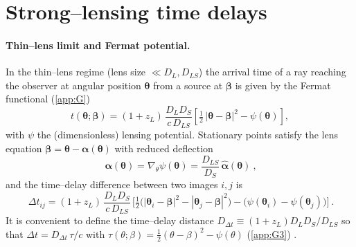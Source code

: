 \documentclass{iopjournal}
\begin{document}
\section{Strong–lensing time delays}\label{sec:delays}
\paragraph{Thin–lens limit and Fermat potential.}
In the thin–lens regime (lens size $\ll D_L,D_{LS}$) the arrival time of a ray reaching the observer at angular position $\boldsymbol\theta$ from a source at $\boldsymbol\beta$ is given by the Fermat functional (\cref{app:G})
\begin{equation}
t(\boldsymbol\theta;\boldsymbol\beta)
=(1+z_L)\,\frac{D_LD_S}{c\,D_{LS}}
\left[\tfrac12\,|\boldsymbol\theta-\boldsymbol\beta|^2-\psi(\boldsymbol\theta)\right],
\label{eq:10_Fermat}
\end{equation}
with $\psi$ the (dimensionless) lensing potential. Stationary points satisfy the lens equation
$\boldsymbol\beta=\boldsymbol\theta-\boldsymbol\alpha(\boldsymbol\theta)$ with reduced deflection
\begin{equation}
\boxed{\ \boldsymbol\alpha(\boldsymbol\theta)=\nabla_{\!\theta}\psi(\boldsymbol\theta)
=\frac{D_{LS}}{D_S}\,\hat{\boldsymbol\alpha}(\boldsymbol\theta)\ },
\label{eq:10_alpha_reduced}
\end{equation}
and the time–delay difference between two images $i,j$ is
\begin{equation}
\boxed{\ \Delta t_{ij}=(1+z_L)\,\frac{D_LD_S}{c\,D_{LS}}\,
\Big[\tfrac12\big(|\boldsymbol\theta_i-\boldsymbol\beta|^2-|\boldsymbol\theta_j-\boldsymbol\beta|^2\big)
-\big(\psi(\boldsymbol\theta_i)-\psi(\boldsymbol\theta_j)\big)\Big]\ } .
\label{eq:10_dt_ij}
\end{equation}
It is convenient to define the time–delay distance $D_{\Delta t}\equiv(1+z_L)D_LD_S/D_{LS}$ so that $\Delta t=D_{\Delta t}\,\tau/c$ with $\tau(\theta;\beta)=\tfrac12(\theta-\beta)^2-\psi(\theta)$ (\cref{app:G3}) \cite{SchneiderEhlersFalco1992,BlandfordNarayan1986,Perlick2004LRR}.
\end{document}
